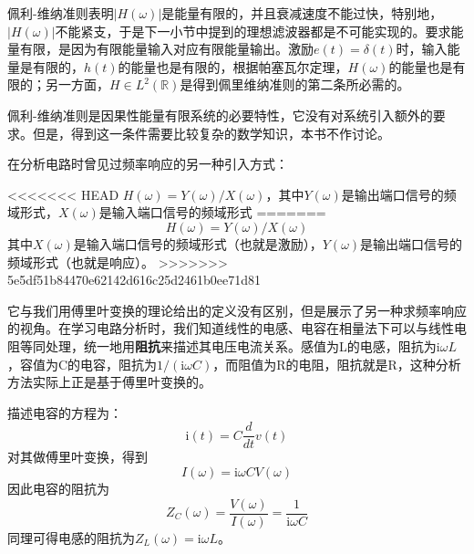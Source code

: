 佩利-维纳准则表明$|H(\omega)|$是能量有限的，并且衰减速度不能过快，特别地，$|H(\omega)|$不能紧支，于是下一小节中提到的理想滤波器都是不可能实现的。要求能量有限，是因为有限能量输入对应有限能量输出。激励$e(t)=\delta(t)$时，输入能量是有限的，$h(t)$的能量也是有限的，根据帕塞瓦尔定理，$H(\omega)$的能量也是有限的；另一方面，$H\in L^2(\mathbb{R})$是得到佩里维纳准则的第二条所必需的。

佩利-维纳准则是因果性能量有限系统的必要特性，它没有对系统引入额外的要求。但是，得到这一条件需要比较复杂的数学知识，本书不作讨论。

在分析电路时曾见过频率响应的另一种引入方式\cite{electronic_circuits}：
\begin{definition}[频率响应]
<<<<<<< HEAD
    $H(\omega)=Y(\omega)/X(\omega)$，其中$Y(\omega)$是输出端口信号的频域形式，$X(\omega)$是输入端口信号的频域形式
=======
    $$H(\omega)=Y(\omega)/X(\omega)$$
    其中$X(\omega)$是输入端口信号的频域形式（也就是激励），$Y(\omega)$是输出端口信号的频域形式（也就是响应）。
>>>>>>> 5e5df51b84470e62142d616c25d2461b0ee71d81
\end{definition}
它与我们用傅里叶变换的理论给出的定义没有区别，但是展示了另一种求频率响应的视角。在学习电路分析时，我们知道线性的电感、电容在相量法下可以与线性电阻等同处理，统一地用\textbf{阻抗}来描述其电压电流关系。感值为L的电感，阻抗为$\mathrm{i}\omega L$，容值为C的电容，阻抗为$1/(\mathrm{i}\omega C)$，而阻值为R的电阻，阻抗就是R，这种分析方法实际上正是基于傅里叶变换的。
\begin{example}
    描述电容的方程为：
\[\mathrm{i}(t)=C\frac{d}{dt}v(t)\]
对其做傅里叶变换，得到
\[I(\omega)=\mathrm{i}\omega C V(\omega)\]
因此电容的阻抗为
\[Z_C(\omega)=\frac{V(\omega)}{I(\omega)}=\frac{1}{\mathrm{i}\omega C}\]
同理可得电感的阻抗为$Z_L(\omega)=\mathrm{i}\omega L$。
\end{example}
